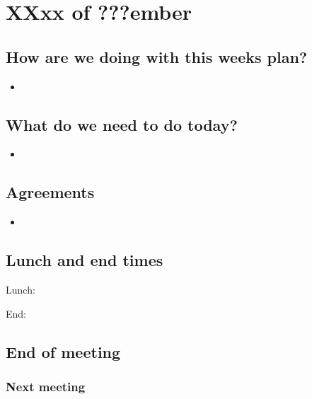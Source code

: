\section{XXxx of ???ember}
\subsection{How are we doing with this weeks plan?}
\begin{itemize}
\item  
\end{itemize}

\subsection{What do we need to do today?}
\begin{itemize}
\item 
\end{itemize}

\subsection{Agreements}
\begin{itemize}
\item 
\end{itemize}
\subsection{Lunch and end times}
Lunch:

End:

\subsection{End of meeting}
\subsubsection{Next meeting}
